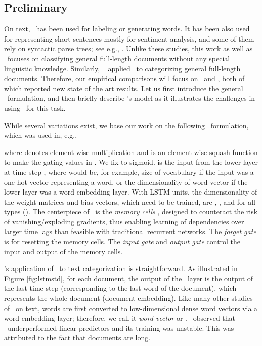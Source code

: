 \documentclass{article}
\begin{document}
\subsection{Preliminary} 


On text, \lstm\ has been used for labeling or generating words.  
It has been also used for representing short sentences 
mostly for sentiment analysis, and some of them rely on syntactic parse trees; 
see e.g., \cite{ZSG15,TQL15,TSM15,LZ15}. Unlike these studies, 
this work as well as \JZab\ 
focuses on classifying general full-length documents without any special linguistic knowledge. 
Similarly, 
\DLa\ \cite{DL15} applied \lstm\ to categorizing general full-length documents. 
Therefore, 
our empirical comparisons will focus on \DLa\ and \JZab, both of which reported 
new state of the art results. 
Let us first introduce the general \lstm\ formulation, 
and then briefly describe \DLa's model as it illustrates the challenges in using \lstms\ for this task.

\mypara{\lstm} 
While several variations exist, 
we base our work on the following \lstm\ formulation, 
which was used in, e.g., \cite{ZI14} 
\newcommand{\squash}{\sigma}

where  denotes element-wise multiplication and 
 is an element-wise squash function to make the gating values in .  
We fix  to sigmoid.   is the input from the lower layer 
at time step , where  would be, for example, 
size of vocabulary if the input was a one-hot vector representing a word, 
or the dimensionality of word vector if the lower layer was a word embedding layer. 
With  LSTM units, the dimensionality of the weight matrices and bias vectors, which need to be trained, are 
, , and  for all types (). 
The centerpiece of \lstm\ is the {\em memory cells} 
, 
designed to counteract the risk of vanishing/exploding gradients, 
thus enabling learning of dependencies over larger time lags 
than feasible with traditional recurrent networks. 
The {\em forget gate}  \cite{GSC00} is for resetting the memory cells.  
The {\em input gate}  and {\em output gate}  control 
the input and output of the memory cells.  

\DLa's application of \lstm\ to text categorization is straightforward.  
As illustrated in Figure \ref{fig:lstmstd}, 
for each document, 
the output of the \lstm\ layer is the output of the last time step (corresponding to the last word of the document), 
which represents the whole document (document embedding). 
Like many other studies of \lstm\ on text, words are first converted to 
low-dimensional dense word vectors via a word embedding layer; therefore, 
we call it {\em word-vector \lstm} or {\em \wvLstm}. 
\DLa\ observed that 
\wvLstm\ underperformed linear predictors and its training was unstable.  
This was attributed to the fact that documents are long. 
\end{document}
